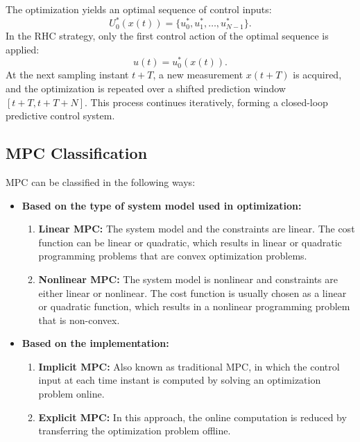 The optimization yields an optimal sequence of control inputs:
\begin{equation}
    U_0^*(x(t)) = \{ u_0^*, u_1^*, \dots, u_{N-1}^* \}.
\end{equation}
\noindent
In the RHC strategy, only the first control action of the optimal sequence is applied:
\begin{equation}
    u(t) = u_0^*(x(t)).
\end{equation}
\noindent
At the next sampling instant $t+T$, a new measurement $x(t+T)$ is acquired, and the optimization is repeated over a shifted prediction window $[t+T, t+T+N]$. This process continues iteratively, forming a closed-loop predictive control system.

\subsection{MPC Classification}

MPC can be classified in the following ways:

\begin{itemize}
    \item \textbf{Based on the type of system model used in optimization:}
    \begin{enumerate}
        \item \textbf{Linear MPC:} The system model and the constraints are linear. The cost function can be linear or quadratic, which results in linear or quadratic programming problems that are convex optimization problems.
        \item \textbf{Nonlinear MPC:} The system model is nonlinear and constraints are either linear or nonlinear. The cost function is usually chosen as a linear or quadratic function, which results in a nonlinear programming problem that is non-convex.
    \end{enumerate}

    \item \textbf{Based on the implementation:}
    \begin{enumerate}
        \item \textbf{Implicit MPC:} Also known as traditional MPC, in which the control input at each time instant is computed by solving an optimization problem online.
        \item \textbf{Explicit MPC:} In this approach, the online computation is reduced by transferring the optimization problem offline.
    \end{enumerate}
\end{itemize}

